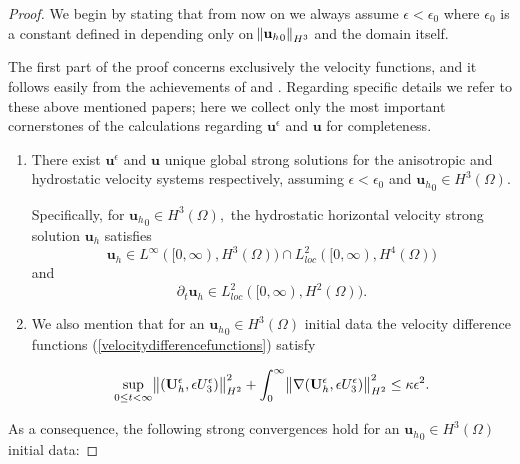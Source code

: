 \documentclass[12pt]{report}
\numberwithin{theorem}{chapter}
\numberwithin{corollary}{chapter}
\numberwithin{lemma}{chapter}
\numberwithin{remark}{chapter}
\numberwithin{definition}{chapter}
\numberwithin{prop}{chapter}
\begin{document}
\begin{proof}

We begin by stating that from now on we always assume $\epsilon < \epsilon_0$ where $\epsilon_0$ is a constant defined in \cite{li2019primitive} depending only on $\norm{{\mathbf{u}_h}_0}_{H^3}$ and the domain itself.

The first part of the proof concerns exclusively the velocity functions, and it follows easily from the achievements of \cite{li2019primitive} and \cite{petcu2005sobolev}. Regarding specific details we refer to these above mentioned papers; here we collect only the most important cornerstones of the calculations regarding $\mathbf{u}^\epsilon$ and $\mathbf{u}$ for completeness.

\begin{enumerate}

  \item There exist $\mathbf{u}^\epsilon$ and $\mathbf{u}$ unique global strong solutions for the anisotropic and hydrostatic velocity systems respectively, assuming $\epsilon < \epsilon_0$ and ${\mathbf{u}_h}_0 \in H^3(\Omega).$
  
  Specifically, for ${\mathbf{u}_h}_0 \in H^3(\Omega),$ the hydrostatic horizontal velocity strong solution $\mathbf{u}_h$ satisfies
%
    \begin{equation} \label{u_regularities_first}
      \mathbf{u}_h \in L^\infty([0, \infty), H^3(\Omega)) \cap L^2_{loc}([0, \infty), H^4(\Omega))
    \end{equation}
%
and
%
    \begin{equation} \label{u_regularities_second}
      \partial_t \mathbf{u}_h \in L^2_{loc}([0, \infty), H^2(\Omega)).
    \end{equation}
%
  \item We also mention that for an ${\mathbf{u}_h}_0 \in H^3(\Omega)$ initial data the velocity difference functions (\ref{velocitydifferencefunctions}) satisfy
  
  \begin{equation} \label{UdifferenceEstimate}
    \sup_{0 \leq t < \infty}{\norm{(\mathbf{U}_h^\epsilon, \epsilon U_3^\epsilon)}_{H^2}^2} + \int_0^\infty \norm{\nabla (\mathbf{U}_h^\epsilon, \epsilon U_3^\epsilon)}_{H^2}^2 \leq \kappa \epsilon^2.
  \end{equation}

\end{enumerate}

As a consequence, the following strong convergences hold for an ${\mathbf{u}_h}_0 \in H^3(\Omega)$ initial data:


\end{proof}
\end{document}
